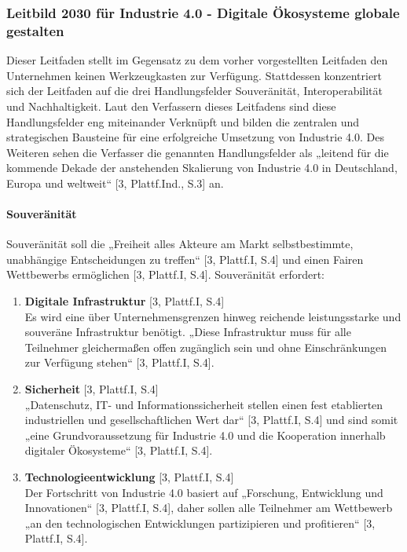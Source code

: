 \subsubsection{Leitbild 2030 für Industrie 4.0 - Digitale Ökosysteme globale gestalten}\label{sec:PlattformIndustrieLeitfaden}
Dieser Leitfaden stellt im Gegensatz zu dem vorher vorgestellten Leitfaden den Unternehmen keinen Werkzeugkasten zur Verfügung. Stattdessen konzentriert sich der Leitfaden auf die drei Handlungsfelder Souveränität, Interoperabilität und Nachhaltigkeit. Laut den Verfassern dieses Leitfadens sind diese Handlungsfelder eng miteinander Verknüpft und bilden die zentralen und strategischen Bausteine für eine erfolgreiche Umsetzung von Industrie 4.0. Des Weiteren sehen die Verfasser die genannten Handlungsfelder als „leitend für die kommende Dekade der anstehenden Skalierung von Industrie 4.0 in Deutschland, Europa und weltweit“ [3, Plattf.Ind., S.3] an.

\paragraph{Souveränität}\label{sec:Souveränität}
\noindent Souveränität soll die „Freiheit alles Akteure am Markt selbstbestimmte, unabhängige Entscheidungen zu treffen“ [3, Plattf.I, S.4] und einen Fairen Wettbewerbs ermöglichen [3, Plattf.I, S.4]. Souveränität erfordert:
\begin{enumerate}
	\item \textbf{Digitale Infrastruktur} [3, Plattf.I, S.4] \\
	Es wird eine über Unternehmensgrenzen hinweg reichende leistungsstarke und souveräne
	Infrastruktur benötigt. „Diese Infrastruktur muss für alle Teilnehmer gleichermaßen offen 
	zugänglich sein und ohne Einschränkungen zur Verfügung stehen“ [3, Plattf.I, S.4].
	\item \textbf{Sicherheit} [3, Plattf.I, S.4] \\
	„Datenschutz, IT- und Informationssicherheit stellen einen fest etablierten industriellen
	und gesellschaftlichen Wert dar“ [3, Plattf.I, S.4] und sind somit „eine Grundvoraussetzung
	für Industrie 4.0 und die Kooperation innerhalb digitaler Ökosysteme“ [3, Plattf.I, S.4].
	\item \textbf{Technologieentwicklung} [3, Plattf.I, S.4] \\
	Der Fortschritt von Industrie 4.0 basiert auf „Forschung, Entwicklung und Innovationen“ 
	[3, Plattf.I, S.4], daher sollen alle Teilnehmer am Wettbewerb „an den technologischen 
	Entwicklungen partizipieren und profitieren“ [3, Plattf.I, S.4].
\end{enumerate}

